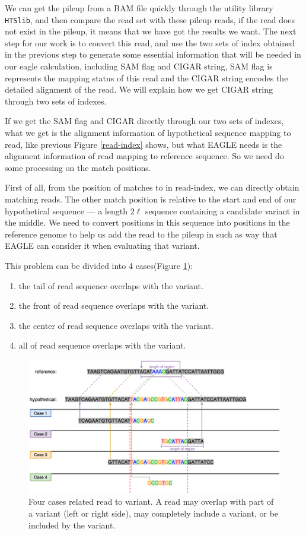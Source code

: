 We can get the pileup from a BAM file quickly through the utility library \texttt{HTSlib}, and then compare the read set with these pileup reads, if the read does not exist in the pileup, it means that we have got the results we want.  The next step for our work is to convert this read, and use the two sets of index obtained in the previous step to generate some essential information that will be needed in our eagle calculation, including SAM flag and CIGAR string, SAM flag is represents the mapping status of this read and the CIGAR string encodes the detailed alignment of the read. We will explain how we get CIGAR string through two sets of indexes.

If we get the SAM flag and CIGAR directly through our two sets of indexes, what we get is the alignment information of hypothetical sequence mapping to read, like previous Figure \ref{read-index} shows, but what EAGLE needs is the alignment information of read mapping to reference sequence. So we need do some processing on the match positions.

First of all, from the position of matches to in read-index, we can directly obtain matching reads.  The other match position is relative to the start and end of our hypothetical sequence --- a length $2\ell$ sequence containing a candidate variant in the middle.  We need to convert positions in this sequence into positions in the reference genome to help us add the read to the pileup in such as way that EAGLE can consider it when evaluating that variant.

\noindent
This problem can be divided into 4 cases(Figure \ref{alignment-read}):
\begin{enumerate}
\itemsep=-0.5em
\item the tail of read sequence overlaps with the variant.
\item the front of read sequence overlaps with the variant.
\item the center of read sequence overlaps with the variant.
\item all of read sequence overlaps with the variant.
\end{enumerate}


\begin{figure}[H]
\centering
\includegraphics[width=1\columnwidth]{body/image/alignment-read.png}
\caption[alignment read]{Four cases related read to variant.  A read may overlap with part of a variant (left or right side), may completely include a variant, or be included by the variant.}
\label{alignment-read}
\end{figure}


